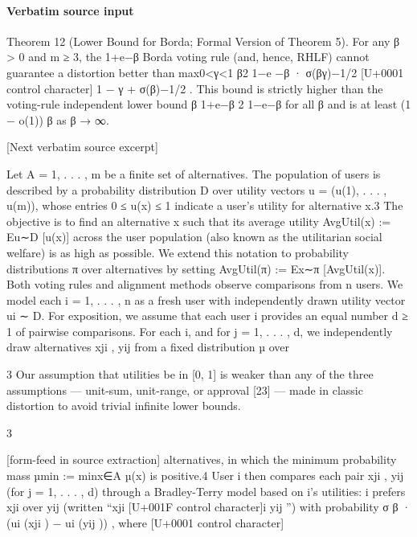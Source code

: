 \documentclass[10pt]{article}
\begin{document}
\paragraph{Verbatim source input}
\begin{ReviewVerbatim}
Theorem 12 (Lower Bound for Borda; Formal Version of Theorem 5). For any β > 0 and m ≥ 3, the
                                                                                           1+e−β
Borda voting rule (and, hence, RHLF) cannot guarantee a distortion better than max0<γ<1 β2 1−e −β ·
          σ(βγ)−1/2  [U+0001 control character]
 1 − γ + σ(β)−1/2 . This bound is strictly higher than the voting-rule independent lower bound
β 1+e−β
2 1−e−β for all β and is at least (1 − o(1)) β as β → ∞.

[Next verbatim source excerpt]

Let A = {1, . . . , m} be a finite set of alternatives. The population of users is described by a
probability distribution D over utility vectors u = (u(1), . . . , u(m)), whose entries 0 ≤ u(x) ≤ 1
indicate a user’s utility for alternative x.3 The objective is to find an alternative x such that its average
utility AvgUtil(x) := Eu∼D [u(x)] across the user population (also known as the utilitarian social
welfare) is as high as possible. We extend this notation to probability distributions π over alternatives
by setting AvgUtil(π) := Ex∼π [AvgUtil(x)].
Both voting rules and alignment methods observe comparisons from n users. We model each
i = 1, . . . , n as a fresh user with independently drawn utility vector ui ∼ D. For exposition, we
assume that each user i provides an equal number d ≥ 1 of pairwise comparisons. For each i,
and for j = 1, . . . , d, we independently draw alternatives xji , yij from a fixed distribution µ over

    3
     Our assumption that utilities be in [0, 1] is weaker than any of the three assumptions — unit-sum, unit-range,
or approval [23] — made in classic distortion to avoid trivial infinite lower bounds.


                                                           3

[form-feed in source extraction]
alternatives, in which the minimum probability mass µmin := minx∈A µ(x) is positive.4 User i
then compares each pair {xji , yij } (for j = 1, . . . , d) through a Bradley-Terry model based on i’s
utilities: i prefers xji over yij (written “xji [U+001F control character]i yij ”) with probability σ β · (ui (xji ) − ui (yij )) , where
                                                                                                        [U+0001 control character]


\end{ReviewVerbatim}
\end{document}

